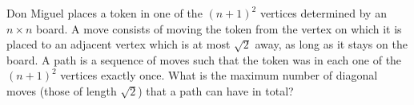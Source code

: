 Don Miguel places a token in one of the $(n+1)^2$ vertices determined by an $n \times n$ board. A move consists of moving the token from the vertex on which it is placed to an adjacent vertex which is at most $\sqrt2$ away, as long as it stays on the board. A path is a sequence of moves such that the token was in each one of the $(n+1)^2$ vertices exactly once. What is the maximum number of diagonal moves (those of length $\sqrt2$) that a path can have in total?
